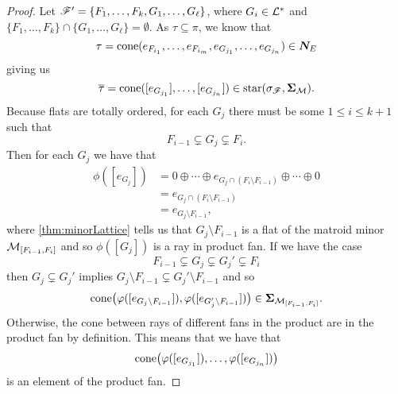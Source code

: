 \documentclass[12pt,oneside]{../../sfsuthesis}
\begin{document}
\begin{proof}
    Let \( \mathscr{F}' = \{ F_1, \dots, F_k, G_1, \dots, G_\ell \} \), where \( G_i \in \mathcal{L}^\ast \) and \( \{ F_1, \dots, F_k \} \cap \{ G_1, \dots, G_\ell \} = \emptyset \).
    As \( \tau \subseteq \pi \), we know that
    \[
        \tau = \mathrm{cone}( e_{F_{i_1}}, \dots, e_{F_{i_m}}, e_{G_{j_1}}, \dots,  e_{G_{j_n}}) \in \bm{N}_E
    \]
    giving us
    \[
        \overline{\tau} = \mathrm{cone}([e_{G_{j_1}}], \dots,  [e_{G_{j_n}}]) \in \operatorname{star}(\sigma_{\mathscr{F}}, {\bm{\Sigma}}_{\mathcal{M}}).
    \]
    Because flats are totally ordered, for each \( G_j \) there must be some {\( 1 \leq i \leq k+1 \)} such that
    \[
        F_{i-1} \subsetneq G_j \subsetneq F_{i}.
    \]
    Then for each \( G_j \) we have that
    \begin{align*}
        \phi([e_{G_j}]) & = 0 \oplus \cdots \oplus e_{G_j \cap (F_i \setminus F_{i-1})} \oplus \cdots \oplus 0 \\
                        & = e_{G_j \cap (F_i \setminus F_{i-1})}                                               \\
                        & = e_{G_j \setminus F_{i-1}},
    \end{align*}
    where \th\ref{thm:minorLattice} tells us that \( G_j \setminus F_{i-1} \) is a flat of the matroid minor \( \mathcal{M}_{[F_{i-1}, F_i]} \) and so \( \phi([G_j]) \) is a ray in product fan.
    If we have the case
    \[
        F_{i-1} \subsetneq G_j \subsetneq  G_j' \subsetneq F_{i}
    \]
    then \( G_j \subsetneq  G_j' \) implies \(  G_j \setminus F_{i-1} \subsetneq  G_j' \setminus F_{i-1} \) and so
    \[
        \mathrm{cone}\big( \varphi([e_{ G_j \setminus F_{i-1}}]), \varphi([e_{G_j' \setminus F_{i-1}}]) \big) \in {\bm{\Sigma}}_{\mathcal{M}_{[F_{i-1}, F_i]}}.
    \]
    Otherwise, the cone between rays of different fans in the product are in the product fan by definition.
    This means that we have that
    \[
        \mathrm{cone}\big( \varphi([e_{G_{j_1}}]), \dots,  \varphi([e_{G_{j_n}}])\big)
    \]
    is an element of the product fan.


\end{proof}
\end{document}
